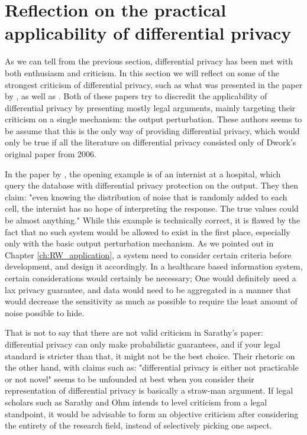 \section{Reflection on the practical applicability of differential privacy}
As we can tell from the previous section, differential privacy has been met with both enthusiasm and criticism. In this section we will reflect on some of the strongest criticism of differential privacy, such as what was presented in the paper by \cite{Sarathy2011evaluating}, as well as \cite{ohm2010brokenPrivacyPromise}. Both of these papers try to discredit the applicability of differential privacy by presenting mostly legal arguments, mainly targeting their criticism on a single mechanism: the output perturbation. These authors seems to be assume that this is the only way of providing differential privacy, which would only be true if all the literature on differential privacy consisted only of Dwork's original paper from 2006. 

In the paper by \cite{Sarathy2011evaluating}, the opening example is of an internist at a hospital, which query the database with differential privacy protection on the output. They then claim: "even knowing the distribution of noise that is randomly added to each cell, the internist has no hope of interpreting the response. The true values could be almost anything." While this example is technically correct, it is flawed by the fact that no such system would be allowed to exist in the first place, especially only with the basic output perturbation mechanism. As we pointed out in Chapter \ref{ch:RW_application}, a system need to consider certain criteria before development, and design it accordingly. In a healthcare based information system, certain considerations would certainly be necessary; One would definitely need a lax privacy guarantee, and data would need to be aggregated in a manner that would decrease the sensitivity as much as possible to require the least amount of noise possible to hide.

That is not to say that there are not valid criticism in Sarathy's paper: differential privacy can only make probabilistic guarantees, and if your legal standard is stricter than that, it might not be the best choice. Their rhetoric on the other hand, with claims such as: "differential privacy is either not practicable or not novel" seems to be unfounded at best when you consider their representation of differential privacy is basically a straw-man argument. If legal scholars such as Sarathy and Ohm intends to level criticism from a legal standpoint, it would be advisable to form an objective criticism after considering the entirety of the research field, instead of  selectively picking one aspect.

